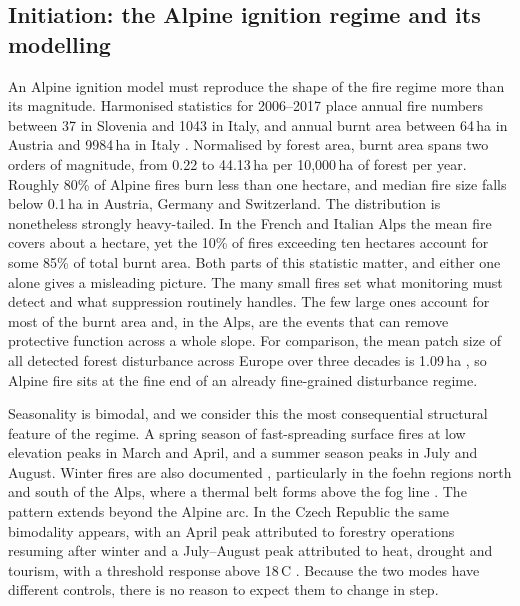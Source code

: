 \documentclass[11pt,a4paper]{article}
\begin{document}
\subsection{Initiation: the Alpine ignition regime and its modelling}

An Alpine ignition model must reproduce the shape of the fire regime more than its magnitude. Harmonised statistics for 2006--2017 place annual fire numbers between 37 in Slovenia and 1043 in Italy, and annual burnt area between 64\,ha in Austria and 9984\,ha in Italy \citep{muller_forest_2020}. Normalised by forest area, burnt area spans two orders of magnitude, from 0.22 to 44.13\,ha per 10{,}000\,ha of forest per year. Roughly 80\% of Alpine fires burn less than one hectare, and median fire size falls below 0.1\,ha in Austria, Germany and Switzerland. The distribution is nonetheless strongly heavy-tailed. In the French and Italian Alps the mean fire covers about a hectare, yet the 10\% of fires exceeding ten hectares account for some 85\% of total burnt area. Both parts of this statistic matter, and either one alone gives a misleading picture. The many small fires set what monitoring must detect and what suppression routinely handles. The few large ones account for most of the burnt area and, in the Alps, are the events that can remove protective function across a whole slope. For comparison, the mean patch size of all detected forest disturbance across Europe over three decades is 1.09\,ha \citep{senf_mapping_2021}, so Alpine fire sits at the fine end of an already fine-grained disturbance regime.

Seasonality is bimodal, and we consider this the most consequential structural feature of the regime. A spring season of fast-spreading surface fires at low elevation peaks in March and April, and a summer season peaks in July and August. Winter fires are also documented \citep{valese_wildfires_2011}, particularly in the foehn regions north and south of the Alps, where a thermal belt forms above the fog line \citep{muller_forest_2020, schunk_forest_2013}. The pattern extends beyond the Alpine arc. In the Czech Republic the same bimodality appears, with an April peak attributed to forestry operations resuming after winter and a July--August peak attributed to heat, drought and tourism, with a threshold response above 18\,\degree C \citep{bercak_combination_2024}. Because the two modes have different controls, there is no reason to expect them to change in step.
\end{document}
